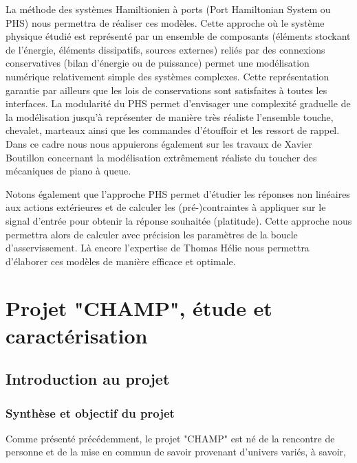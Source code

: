 \documentclass[french,a4paper,12pt]{report}
\begin{document}
La méthode des systèmes Hamiltionien à ports (Port Hamiltonian System ou PHS) nous permettra de réaliser ces modèles. Cette approche où le système physique étudié est représenté par un ensemble de composants (éléments stockant de l’énergie, éléments dissipatifs, sources externes) reliés par des connexions conservatives (bilan d’énergie ou de puissance) permet une modélisation numérique relativement simple des systèmes complexes. Cette représentation garantie par ailleurs que les lois de conservations sont satisfaites à toutes les interfaces. La modularité du PHS permet d’envisager une complexité graduelle de la modélisation jusqu’à représenter de manière très réaliste l’ensemble touche, chevalet, marteaux ainsi que les commandes d’étouffoir et les ressort de rappel. Dans ce cadre nous nous appuierons également sur les travaux de Xavier Boutillon concernant la modélisation extrêmement réaliste du toucher des mécaniques de piano à queue.

Notons également que l’approche PHS permet d’étudier les réponses non linéaires aux actions extérieures et de calculer les (pré-)contraintes à appliquer sur le signal d’entrée pour obtenir la réponse souhaitée (platitude). Cette approche nous permettra alors de calculer avec précision les paramètres de la boucle d’asservissement. Là encore l’expertise de Thomas Hélie nous permettra d’élaborer ces modèles de manière efficace et optimale.



%
%
\part{Projet "CHAMP", étude et caractérisation}

	\chapter{Introduction au projet}
	
	\section{Synthèse et objectif du projet}
	
	Comme présenté précédemment, le projet "CHAMP" est né de la rencontre de personne et de la mise en commun de savoir provenant d'univers variés, à savoir, 
	
\end{document}
